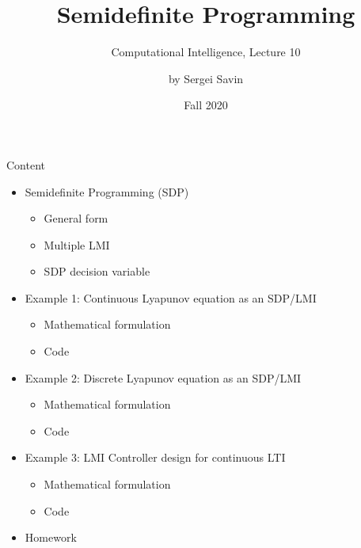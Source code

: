 \documentclass{beamer}
\title{Semidefinite Programming}
\subtitle{Computational Intelligence, Lecture 10}
\author{by Sergei Savin}
\date{Fall 2020}
\begin{document}
\maketitle


\begin{frame}{Content}

\begin{itemize}
\item  Semidefinite Programming (SDP)
\begin{itemize}
    \item General form
    \item Multiple LMI
    \item SDP decision variable
\end{itemize}
\item  Example 1:  Continuous Lyapunov equation as an SDP/LMI
\begin{itemize}
    \item Mathematical formulation
    \item Code
\end{itemize}
\item  Example 2:  Discrete Lyapunov equation as an SDP/LMI
\begin{itemize}
    \item Mathematical formulation
    \item Code
\end{itemize}
\item  Example 3:  LMI Controller design for continuous LTI
\begin{itemize}
    \item Mathematical formulation
    \item Code
\end{itemize}
\item Homework
\end{itemize}

\end{frame}
\end{document}
